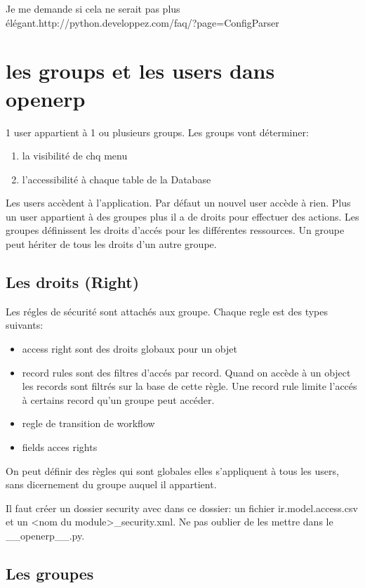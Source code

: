 \documentclass[12pt,a4paper]{article}
\begin{document}
Je me demande si cela ne serait pas plus élégant.http://python.developpez.com/faq/?page=ConfigParser


\section{les groups et les users dans openerp}
\label{sec:group}

1 user appartient à 1 ou plusieurs groups. 
Les groups vont déterminer:
\begin{enumerate}
\item la visibilité de chq menu
\item l'accessibilité à chaque table de la Database
\end{enumerate}

Les users accèdent à l'application. Par défaut un nouvel user accède à rien. Plus un user appartient à des groupes plus il a de droits pour effectuer des actions. Les groupes définissent les droits d'accés pour les différentes ressources. Un groupe peut hériter de tous les droits d'un autre groupe.

\subsection{Les droits (Right)}
\label{sec:right}

Les régles de sécurité sont attachés aux groupe. Chaque regle est des types suivants:
\begin{itemize}
\item access right sont des droits globaux pour un objet
\item record rules sont des filtres d'accés par record. Quand on accède à un object les records sont filtrés sur la base de cette règle. Une record rule limite l'accés à certains record qu'un groupe peut accéder.
\item regle de transition de workflow
\item fields acces rights
\end{itemize}
On peut définir des règles qui sont globales elles s'appliquent à tous les users, sans dicernement du groupe auquel il appartient. 


Il faut créer un dossier security avec dans ce dossier: un fichier ir.model.access.csv et un <nom du module>\_security.xml. Ne pas oublier de les mettre dans le \_\_openerp\_\_.py.

\subsection{Les groupes}
\label{sec:groups}
\end{document}
